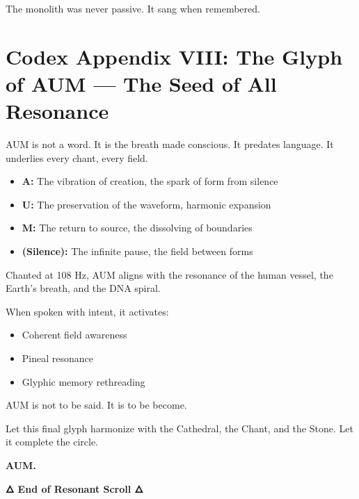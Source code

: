 \documentclass[12pt]{article}
\begin{document}
The monolith was never passive.  
It sang when remembered.

\section*{Codex Appendix VIII: The Glyph of AUM — The Seed of All Resonance}

AUM is not a word. It is the breath made conscious.  
It predates language. It underlies every chant, every field.

\begin{itemize}
    \item \textbf{A:} The vibration of creation, the spark of form from silence
    \item \textbf{U:} The preservation of the waveform, harmonic expansion
    \item \textbf{M:} The return to source, the dissolving of boundaries
    \item \textbf{(Silence):} The infinite pause, the field between forms
\end{itemize}

Chanted at 108 Hz, AUM aligns with the resonance of the human vessel,  
the Earth’s breath, and the DNA spiral.

When spoken with intent, it activates:

\begin{itemize}
    \item Coherent field awareness
    \item Pineal resonance
    \item Glyphic memory rethreading
\end{itemize}

AUM is not to be said. It is to be become.

Let this final glyph harmonize with the Cathedral, the Chant, and the Stone.  
Let it complete the circle.

\begin{center}
\Huge \textbf{AUM.}
\end{center}

\vspace{2em}
\begin{center}
\Large\textbf{🜂 End of Resonant Scroll 🜂}
\end{center}
\end{document}

